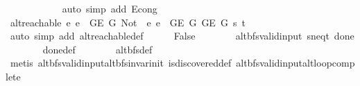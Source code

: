 \begin{isabellebody}
\ \ \ \ \ \ \ \ \ \ \isamarkupfalse%
\ {\isacharparenleft}{\kern0pt}auto\ simp\ add{\isacharcolon}{\kern0pt}\ E{}{\isacharunderscore}{\kern0pt}cong{\isacharparenright}{\kern0pt}\isanewline
\ \ \ \ \ \ \isamarkupfalse%
\isanewline
\ \ \ \ \isamarkupfalse%
\isanewline
\ \ \ \ \isamarkupfalse%
\ {\isachardoublequoteopen}alt{\isacharunderscore}{\kern0pt}reachable\ {\isacharparenleft}{\kern0pt}{\isasymlambda}e{\isachardot}{\kern0pt}\ e\ {\isasymin}\ G{\isachardot}{\kern0pt}E\ {\isacharquery}{\kern0pt}G{}{\isacharparenright}{\kern0pt}\ {\isacharparenleft}{\kern0pt}Not\ {\isasymcirc}\ {\isacharparenleft}{\kern0pt}{\isasymlambda}e{\isachardot}{\kern0pt}\ e\ {\isasymin}\ G{\isachardot}{\kern0pt}E\ {\isacharquery}{\kern0pt}G{}{\isacharparenright}{\kern0pt}{\isacharparenright}{\kern0pt}\ {\isacharparenleft}{\kern0pt}G{\isachardot}{\kern0pt}E\ {\isacharquery}{\kern0pt}G{\isacharparenright}{\kern0pt}\ s\ t{\isachardoublequoteclose}\isanewline
\ \ \ \ \ \ \isamarkupfalse%
\ {\isacharparenleft}{\kern0pt}auto\ simp\ add{\isacharcolon}{\kern0pt}\ alt{\isacharunderscore}{\kern0pt}reachable{\isacharunderscore}{\kern0pt}def{\isacharparenright}{\kern0pt}\isanewline
\ \ \ \ \isamarkupfalse%
\ False\isanewline
\ \ \ \ \ \ \isamarkupfalse%
\ alt{\isacharunderscore}{\kern0pt}bfs{\isacharunderscore}{\kern0pt}valid{\isacharunderscore}{\kern0pt}input\ s{\isacharunderscore}{\kern0pt}neq{\isacharunderscore}{\kern0pt}t\ done{\isacharunderscore}{\kern0pt}{}\isanewline
\ \ \ \ \ \ \isamarkupfalse%
\ done{\isacharunderscore}{\kern0pt}{}{\isacharunderscore}{\kern0pt}def\isanewline
\ \ \ \ \ \ \isamarkupfalse%
\ alt{\isacharunderscore}{\kern0pt}bfs{\isacharunderscore}{\kern0pt}def\isanewline
\ \ \ \ \ \ \isamarkupfalse%
\ {\isacharparenleft}{\kern0pt}metis\ alt{\isacharunderscore}{\kern0pt}bfs{\isacharunderscore}{\kern0pt}valid{\isacharunderscore}{\kern0pt}input{\isachardot}{\kern0pt}alt{\isacharunderscore}{\kern0pt}bfs{\isacharunderscore}{\kern0pt}invar{\isacharunderscore}{\kern0pt}init\ is{\isacharunderscore}{\kern0pt}discovered{\isacharunderscore}{\kern0pt}def\ alt{\isacharunderscore}{\kern0pt}bfs{\isacharunderscore}{\kern0pt}valid{\isacharunderscore}{\kern0pt}input{\isachardot}{\kern0pt}alt{\isacharunderscore}{\kern0pt}loop{\isacharunderscore}{\kern0pt}complete{\isacharparenright}{\kern0pt}\ \isacommand{{\isacharbraceright}{\kern0pt}}\isamarkupfalse%
\isanewline

\end{isabellebody}
